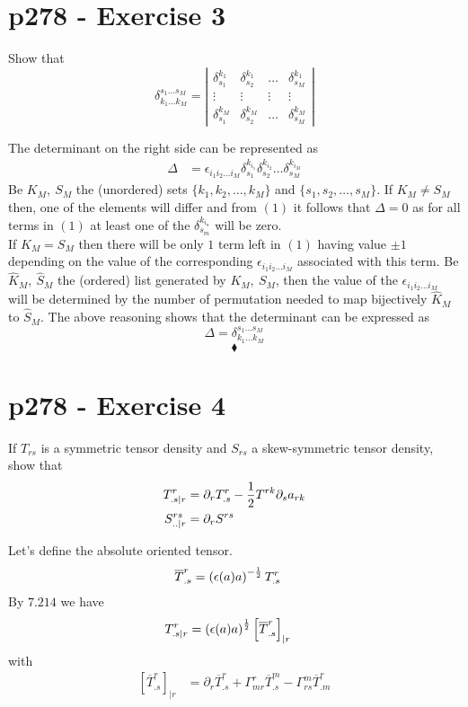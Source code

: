 \section{p278 - Exercise 3}
\begin{tcolorbox}
Show that
$$\delta_{k_1 \dots k_M}^{s_1 \dots s_M}=\left|\begin{matrix}
\delta_{s_1}^{k_1}&\delta_{s_2}^{k_1}&\dots &\delta_{s_M}^{k_1}\\
\vdots &\vdots &\vdots& \vdots \\
\delta_{s_1}^{k_M}&\delta_{s_2}^{k_M}&\dots&\delta_{s_M}^{k_M}
\end{matrix}\right|$$ 
\end{tcolorbox}
The determinant on the right side can be represented as
\begin{align}
\Delta &= \epsilon_{i_1 i_2\dots i_M}\delta_{s_1}^{k_{i_1}}\delta_{s_2}^{k_{i_2}} \dots \delta_{s_M}^{k_{i_M}}
\end{align}
Be $K_M, \ S_M$ the (unordered) sets $\{k_1, k_2,\dots , k_M \}$ and $\{s_1, s_2,\dots , s_M \}$. If $K_M \ne S_M$ then, one of the elements will differ and from $(1)$ it follows that $\Delta =0$ as for all terms in $(1)$ at least one of  the $\delta_{s_m}^{k_{i_n}}$ will be zero.\\
If $K_M = S_M$ then there will be only $1$ term left in $(1)$ having value $\pm 1$ depending on the value of the corresponding $\epsilon_{i_1 i_2\dots i_M}$ associated with this term.
Be $\hat{K}_M, \ \hat{S}_M$ the (ordered) list generated by $K_M, \ S_M$, then the value of the $\epsilon_{i_1 i_2\dots i_M}$ will be determined by the number of permutation needed to map bijectively $\hat{K}_M$ to $\hat{S}_M$. 
The above reasoning shows that the determinant can be expressed as 
$$\Delta = \delta_{k_1 \dots k_M}^{s_1 \dots s_M}$$
$$\blacklozenge$$
\newpage


\section{p278 - Exercise 4}
\begin{tcolorbox}
If $T_{rs}$ is a symmetric tensor density and $S_{rs}$ a skew-symmetric tensor density, show that
\begin{align*}
T^r_{.s|r}&= \partial_r T^r_{.s} - \frac{1}{2} T^{rk}\partial_s a_{rk}\\
S^{rs}_{..|r}&= \partial_r S^{rs}
\end{align*}
\end{tcolorbox}
Let's define the absolute oriented tensor.
\begin{align}
\overline{T}^r_{.s} &= \left(\epsilon (a) a\right)^{-\frac{1}{2}}T^r_{.s}
\end{align}
By $\mathbf{7.214}$ we have
\begin{align}
T^r_{.s|r}&= \left(\epsilon (a) a \right)^{\frac{1}{2}}\left[\overline{T}^r_{.s} \right]_{|r}
\end{align}
with 
\begin{align}
\left[\overline{T}^r_{.s} \right]_{|r}&= \partial_r \overline{T}^r_{.s}  + \Gamma^r_{mr}\overline{T}^m_{.s} - \Gamma^m_{rs}\overline{T}^r_{.m}
\end{align}

